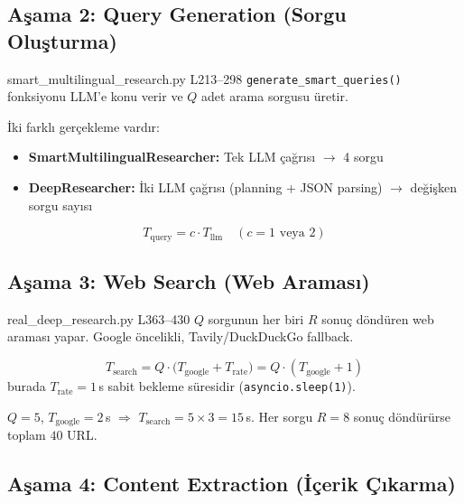 \subsection{A\c{s}ama 2: Query Generation (Sorgu Olu\c{s}turma)}

\begin{kodref}{smart\_multilingual\_research.py L213--298}
\texttt{generate\_smart\_queries()} fonksiyonu LLM'e konu verir ve $Q$ adet arama sorgusu \"{u}retir.
\end{kodref}

\.{I}ki farkl{\i} ger\c{c}ekleme vard{\i}r:
\begin{itemize}
  \item \textbf{SmartMultilingualResearcher:} Tek LLM \c{c}a\u{g}r{\i}s{\i} $\rightarrow$ 4 sorgu
  \item \textbf{DeepResearcher:} \.{I}ki LLM \c{c}a\u{g}r{\i}s{\i} (planning + JSON parsing) $\rightarrow$ de\u{g}i\c{s}ken sorgu say{\i}s{\i}
\end{itemize}

\begin{equation}
\label{eq:query_time}
T_{\text{query}} = c \cdot T_{\text{llm}} \quad (c = 1 \text{ veya } 2)
\end{equation}

\subsection{A\c{s}ama 3: Web Search (Web Aramas{\i})}

\begin{kodref}{real\_deep\_research.py L363--430}
$Q$ sorgunun her biri $R$ sonu\c{c} d\"{o}nd\"{u}ren web aramas{\i} yapar. Google \"{o}ncelikli, Tavily/DuckDuckGo fallback.
\end{kodref}

\begin{equation}
\label{eq:search_time}
T_{\text{search}} = Q \cdot \bigl(T_{\text{google}} + T_{\text{rate}}\bigr) = Q \cdot (T_{\text{google}} + 1)
\end{equation}
burada $T_{\text{rate}} = 1$\,s sabit bekleme s\"{u}residir (\texttt{asyncio.sleep(1)}).

\begin{ornek}
$Q = 5$, $T_{\text{google}} = 2$\,s $\Rightarrow$ $T_{\text{search}} = 5 \times 3 = 15$\,s. Her sorgu $R = 8$ sonu\c{c} d\"{o}nd\"{u}r\"{u}rse toplam $40$ URL.
\end{ornek}

\subsection{A\c{s}ama 4: Content Extraction (\.{I}\c{c}erik \c{C}{\i}karma)}

